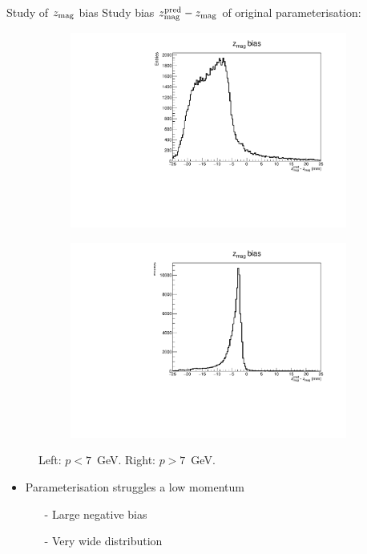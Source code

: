 \documentclass[xcolor={dvipsnames}]{beamer}
\begin{document}
\begin{frame}{Study of $z_{\rm mag}$ bias}
  \vspace{0.0cm}
  {\Large Study bias $z_{\rm mag}^{\rm pred} - z_{\rm mag}$ of original parameterisation:}
  \begin{figure}[htb]
    \centering
    \begin{subfigure}{0.50\textwidth}
      \includegraphics[width=1\textwidth]{Plots/z_mag_position_bias_old_parameterisation_low_p.pdf}
    \end{subfigure}%
    \begin{subfigure}{0.50\textwidth}
      \includegraphics[width=1\textwidth]{Plots/z_mag_position_bias_old_parameterisation_high_p.pdf}
    \end{subfigure}
    \vspace{-0.2cm}
    \caption*{Left: $p < 7$~GeV. Right: $p > 7$~GeV.}
  \end{figure}
  \vspace{-0.5cm}
  \begin{itemize}
    \item{Parameterisation struggles a low momentum}
    \begin{itemize}
      \item[-]{Large negative bias}
      \item[-]{Very wide distribution}
    \end{itemize}
  \end{itemize}
\end{frame}
\end{document}
